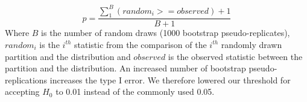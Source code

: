 \documentclass[a4paper,11pt]{article}
\begin{document}
\begin{equation}
    p=\frac{\sum_1^B\left(random_{i} >= observed\right)+1}{B + 1}
\end{equation}
\noindent Where $B$ is the number of random draws (1000 bootstrap pseudo-replicates), $random_{i}$ is the $i^{th}$ statistic from the comparison of the $i^{th}$ randomly drawn partition and the distribution and $observed$ is the observed statistic between the partition and the distribution.
An increased number of bootstrap pseudo-replications increases the type I error.
We therefore lowered our threshold for accepting $H_{0}$ to 0.01 instead of the commonly used 0.05.
\end{document}
